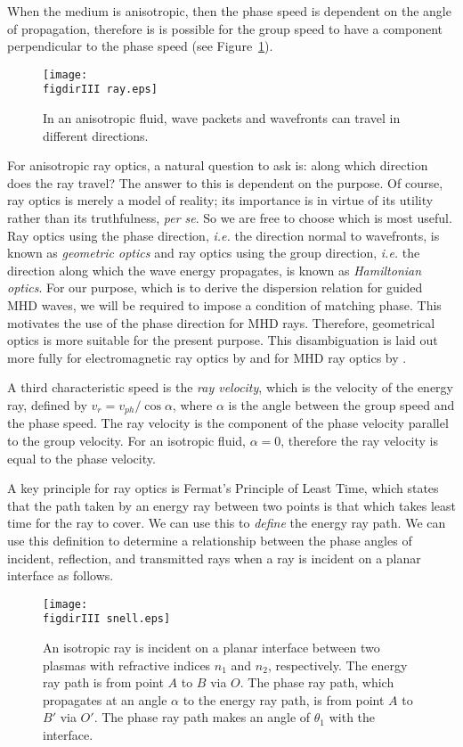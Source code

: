 	When the medium is anisotropic, then the phase speed is dependent on the angle of propagation, therefore is is possible for the group speed to have a component perpendicular to the phase speed (see Figure~\ref{fig: anisotropic ray direction}).
	\begin{figure}
		\centering
		\texttt{[image: \\figdirIII ray.eps]}
		\caption{In an anisotropic fluid, wave packets and wavefronts can travel in different directions.}
		\label{fig: anisotropic ray direction}
	\end{figure}
	For anisotropic ray optics, a natural question to ask is: along which direction does the ray travel? The answer to this is dependent on the purpose. Of course, ray optics is merely a model of reality; its importance is in virtue of its utility rather than its truthfulness, \textit{per se}. So we are free to choose which is most useful. Ray optics using the phase direction, \textit{i.e.} the direction normal to wavefronts, is known as \textit{geometric optics} and ray optics using the group direction, \textit{i.e.} the direction along which the wave energy propagates, is known as \textit{Hamiltonian optics}. For our purpose, which is to derive the dispersion relation for guided MHD waves, we will be required to impose a condition of matching phase. This motivates the use of the phase direction for MHD rays. Therefore, geometrical optics is more suitable for the present purpose. This disambiguation is laid out more fully for electromagnetic ray optics by \cite{has88} and for MHD ray optics by \cite{wal77}.
	
	A third characteristic speed is the \textit{ray velocity}, which is the velocity of the energy ray, defined by $v_r = v_{ph}/\cos{\alpha}$, where $\alpha$ is the angle between the group speed and the phase speed. The ray velocity is the component of the phase velocity parallel to the group velocity. For an isotropic fluid, $\alpha = 0$, therefore the ray velocity is equal to the phase velocity.
	
	A key principle for ray optics is Fermat's Principle of Least Time, which states that the path taken by an energy ray between two points is that which takes least time for the ray to cover. We can use this to \textit{define} the energy ray path. We can use this definition to determine a relationship between the phase angles of incident, reflection, and transmitted rays when a ray is incident on a planar interface as follows.
	
	\begin{figure}
		\centering
		\texttt{[image: \\figdirIII snell.eps]}
		\caption{An isotropic ray is incident on a planar interface between two plasmas with refractive indices $n_1$ and $n_2$, respectively. The energy ray path is from point $A$ to $B$ via $O$. The phase ray path, which propagates at an angle $\alpha$ to the energy ray path, is from point $A$ to $B'$ via $O'$. The phase ray path makes an angle of $\theta_1$ with the interface.}
		\label{fig: fermat}
	\end{figure}
	
